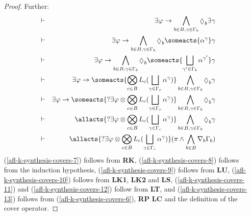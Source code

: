 \begin{proof}
    Further:
    \begin{eqnarray}
        &\proves& \somerefs \phi \implies \bigwedge_{\agentB \in \agentsB, \gamma \in \Gamma_\agentB} \possible_\agentB \somerefs \gamma\label{afl-k-synthesis-covers-7}\\
        &\proves& \somerefs \phi \implies \bigwedge_{\agentB \in \agentsB, \gamma \in \Gamma_\agentB} \possible_\agentB \someacts{\alpha^{\gamma}} \gamma\label{afl-k-synthesis-covers-8}\\
        &\proves& \somerefs \phi \implies \bigwedge_{\agentB \in \agentsB, \gamma \in \Gamma_\agentB} \possible_\agentB \someacts{\bigchoice_{\gamma' \in \Gamma_\agentB} \alpha^{\gamma'}} \gamma\label{afl-k-synthesis-covers-9}\\
        &\proves& \somerefs \phi \implies \someacts{\bigcompose_{\agentC \in \agentsB} \learns_\agentC (\bigchoice_{\gamma \in \Gamma_\agentC} \alpha^\gamma)} \bigwedge_{\agentB \in \agentsB, \gamma \in \Gamma_\agentB} \possible_\agentB \gamma\label{afl-k-synthesis-covers-10}\\
        &\proves& \somerefs \phi \implies \someacts{\test{\somerefs \phi} \compose \bigcompose_{\agentC \in \agentsB} \learns_\agentC (\bigchoice_{\gamma \in \Gamma_\agentC} \alpha^\gamma)} \bigwedge_{\agentB \in \agentsB, \gamma \in \Gamma_\agentB} \possible_\agentB \gamma\label{afl-k-synthesis-covers-11}\\
        &\proves& \allacts{\test{\somerefs \phi} \compose \bigcompose_{\agentC \in \agentsB} \learns_\agentC (\bigchoice_{\gamma \in \Gamma_\agentC} \alpha^\gamma)} \bigwedge_{\agentB \in \agentsB, \gamma \in \Gamma_\agentB} \possible_\agentB \gamma\label{afl-k-synthesis-covers-12}\\
        &\proves& \allacts{\test{\somerefs \phi} \compose \bigcompose_{\agentC \in \agentsB} \learns_\agentC (\bigchoice_{\gamma \in \Gamma_\agentC} \alpha^\gamma)} (\pi \land \bigwedge_{\agentB \in \agentsB} \coversB \Gamma_\agentB)\label{afl-k-synthesis-covers-13}
    \end{eqnarray}
    (\ref{afl-k-synthesis-covers-7}) follows from {\bf RK},
    (\ref{afl-k-synthesis-covers-8}) follows from the induction hypothesis,
    (\ref{afl-k-synthesis-covers-9}) follows from {\bf LU},
    (\ref{afl-k-synthesis-covers-10}) follows from {\bf LK1}, {\bf LK2} and {\bf LS},
    (\ref{afl-k-synthesis-covers-11}) and (\ref{afl-k-synthesis-covers-12}) follow from {\bf LT}, and
    (\ref{afl-k-synthesis-covers-13}) follows from (\ref{afl-k-synthesis-covers-6}), {\bf RP} {\bf LC} and the definition of the cover operator.


\end{proof}
